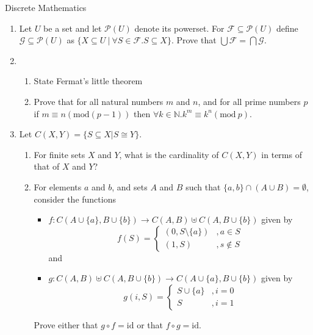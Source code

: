 \documentclass{tripos}
\begin{document}
\begin{question}[MockIA,year=2025,paper=1,question=2,author=rrw]{Discrete Mathematics}

\begin{enumerate}
  \item Let $U$ be a set and let ${\mathcal P}(U)$ denote its powerset.
For ${\mathcal F} \subseteq {\mathcal P}(U)$ define ${\mathcal G} \subseteq {\mathcal P}(U)$ as $\{ X \subseteq U\ |\ \forall S \in {\mathcal F}. S \subseteq X\}$.
Prove that $\bigcup {\mathcal F} = \bigcap {\mathcal G}$. 
\item
  \begin{enumerate}
  \item State Fermat's little theorem 
  \item Prove that for all natural numbers $m$ and $n$, and for all prime numbers $p$ if $m \equiv n (\mbox{mod}(p-1))$ then $\forall k \in \mathbb{N}. k^m \equiv k^n (\mbox{mod}\ p)$.
  \end{enumerate}

\item Let $C(X,Y) = \{ S \subseteq X | S \cong Y \}$.
  \begin{enumerate}
  \item For finite sets $X$ and $Y$, what is the cardinality of $C(X,Y)$ in terms of that of $X$ and $Y$?
  \item For elements $a$ and $b$, and sets $A$ and $B$ such that $\{a,b\} \cap (A \cup B) = \emptyset$, consider the functions
    \begin{itemize}
    \item $f: C(A \cup \{a\}, B \cup \{b\}) \rightarrow C(A,B) \uplus C(A,B \cup \{b\})$ given by
      \[
      f(S) = \begin{cases}
        (0,S \setminus \{a\}) & , a \in S \\
        (1,S) & , s \notin S
          \end{cases}
      \]
      and
    \item
      $g : C(A,B) \uplus C(A,B \cup \{b\}) \rightarrow C(A \cup \{a\}, B \cup \{b\})$ given by
      \[
      g(i,S) = \begin{cases}
        S \cup \{a\} &, i = 0 \\
        S &, i = 1
      \end{cases}
      \]
    \end{itemize}

    Prove either that $g \circ f = \mbox{id}$ or that $f \circ g = \mbox{id}$.
    \end{enumerate}
  
\end{enumerate}

\end{question}
\end{document}
